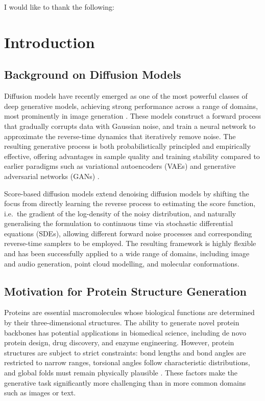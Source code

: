 \documentclass[a4paper,12pt]{article}
\begin{document}
I would like to thank the following:
\clearpage

\tableofcontents
\listoffigures
\listoftables
\clearpage


\section{Introduction}
\subsection{Background on Diffusion Models}
Diffusion models have recently emerged as one of the most powerful classes of deep generative models, achieving strong performance across a range of domains, most prominently in image generation \citep{hoDenoisingDiffusionProbabilistic2020,dhariwal2021DiffusionModelsBeat}. These models construct a forward process that gradually corrupts data with Gaussian noise, and train a neural network to approximate the reverse-time dynamics that iteratively remove noise. The resulting generative process is both probabilistically principled and empirically effective, offering advantages in sample quality and training stability compared to earlier paradigms such as variational autoencoders (VAEs) \citep{kingma2022AutoEncodingVariationalBayes} and generative adversarial networks (GANs) \citep{goodfellow2020GenerativeAdversarialNetworks}.

Score-based diffusion models \citep{song2019GenerativeModelingEstimating,songImprovedTechniquesTraining2020,song2021ScoreBasedGenerativeModeling,songMaximumLikelihoodTraining2021} extend denoising diffusion models by shifting the focus from directly learning the reverse process to estimating the score function, i.e.\ the gradient of the log-density of the noisy distribution, and naturally generalising the formulation to continuous time via stochastic differential equations (SDEs), allowing different forward noise processes and corresponding reverse-time samplers to be employed. The resulting framework is highly flexible and has been successfully applied to a wide range of domains, including image and audio generation, point cloud modelling, and molecular conformations.

\subsection{Motivation for Protein Structure Generation}
Proteins are essential macromolecules whose biological functions are determined by their three-dimensional structures. The ability to generate novel protein backbones has potential applications in biomedical science, including de novo protein design, drug discovery, and enzyme engineering. However, protein structures are subject to strict constraints: bond lengths and bond angles are restricted to narrow ranges, torsional angles follow characteristic distributions, and global folds must remain physically plausible \citep{creighton1993proteins,branden2012IntroductionProteinStructure}. These factors make the generative task significantly more challenging than in more common domains such as images or text.
\end{document}
